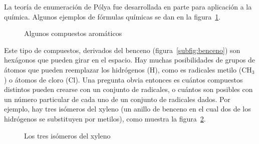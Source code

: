   La teoría de enumeración de Pólya%
  fue desarrollada en parte para aplicación a la química.
  Algunos ejemplos de fórmulas químicas
  se dan en la figura~\ref{fig:aromaticos}.
  \begin{figure}[htbp]
    \centering
    \hspace*{3em}%
    \hspace*{3em}%
    \caption{Algunos compuestos aromáticos}
    \label{fig:aromaticos}
  \end{figure}
  Este tipo de compuestos,
  derivados del benceno (figura~\ref{subfig:benceno})
  son hexágonos que pueden girar en el espacio.
  Hay muchas posibilidades de grupos de átomos
  que pueden reemplazar los hidrógenos (\(\text{H}\)),
  como es radicales metilo (\(\text{CH}_3\))
  o átomos de cloro (\(\text{Cl}\)).
  Una pregunta obvia entonces
  es cuántos compuestos distintos pueden crearse
  con un conjunto de radicales,
  o cuántos son posibles con un número particular
  de cada uno de un conjunto de radicales dados.
  Por ejemplo,
  hay tres isómeros del xyleno
  (un anillo de benceno en el cual dos de los hidrógenos
   se substituyen por metilos),
  como muestra la figura~\ref{fig:isomeros-xyleno}.
  \begin{figure}[htbp]
    \centering
    \hspace*{3em}%
    \hspace*{3em}%
    \caption{Los tres isómeros del xyleno}
    \label{fig:isomeros-xyleno}
  \end{figure}


